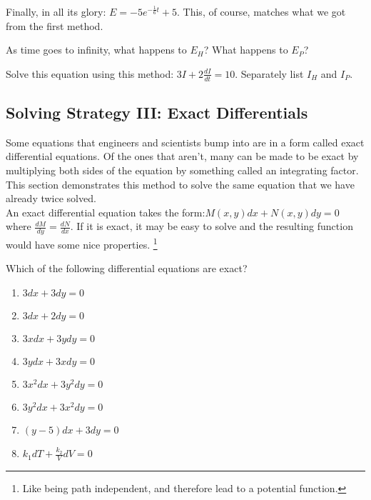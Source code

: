 Finally, in all its glory: $E = -5e^{-\frac{1}{6}t}+5$. This, of course, matches what we got from the first method.

\begin{blevel}
As time goes to infinity, what happens to $E_H$? What happens to $E_P$?
\end{blevel}

\begin{clevel}
Solve this equation using this method: $3I + 2\frac{dI}{dt}=10$. Separately list $I_H$ and $I_P$.
\end{clevel}



\subsection{Solving Strategy III: Exact Differentials}

Some equations that engineers and scientists bump into are in a form called exact differential equations. Of the ones that aren't, many can be made to be exact by multiplying both sides of the equation by something called an integrating factor. This section demonstrates this method to solve the same equation that we have already twice solved.\\

An exact differential equation takes the form:$M(x,y)dx + N(x,y)dy = 0$ where $\frac{dM}{dy}=\frac{dN}{dx}$. If it is exact, it may be easy to solve and the resulting function would have some nice properties. \footnote{Like being path independent, and therefore lead to a potential function.}

\begin{blevel}
Which of the following differential equations are exact?
\begin{enumerate}
\item $3dx + 3dy = 0$
\item $3dx + 2dy = 0$
\item $3xdx + 3ydy = 0$
\item $3ydx + 3xdy = 0$
\item $3x^2dx + 3y^2dy = 0$
\item $3y^2dx + 3x^2dy = 0$
\item $(y-5)dx + 3dy = 0$
\item $k_1dT+\frac{k_2}{V}dV=0$
\end{enumerate}
\end{blevel}

